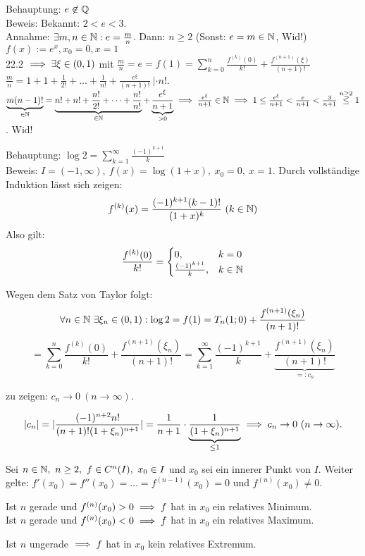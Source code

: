 \documentclass[a4paper,twoside,DIV15,BCOR12mm]{scrbook}
\begin{document}
\begin{beispiele}
\item Behauptung: $e \not\in \mathbb{Q}$ \\
Beweis: Bekannt: $2<e<3$. \\
Annahme: $\exists m,n\in\mathbb{N}: e=\frac{m}{n}$. Dann: $n\ge 2$ (Sonst: $e=m\in\mathbb{N}$, Wid!)\
$f(x):= e^x, x_0 = 0, x=1$ \\
22.2 $\implies \exists \xi \in (0,1)$ mit $\frac{m}{n}=e=f(1)=\sum_{k=0}^n\frac{f^{(k)}(0)}{k!} + \frac{f^{(n+1)}(\xi)}{(n+1)!}$\\
$\frac{m}{n} = 1 + 1+ \frac{1}{2!} + \ldots + \frac{1}{n!} + \frac{e^\xi}{(n+1)!}\  | \cdot n!$. \\
$\underbrace{m(n-1)!}_{\in\mathbb{N}} = \underbrace{n! + n! + \frac{n!}{2!} + \cdots + \frac{n!}{n!}}_{\in \mathbb{N}} + \underbrace{\frac{e^\xi}{n+1}}_{>0} \implies \frac{e^\xi}{n+1} \in \mathbb{N} \implies 1 \le \frac{e^\xi}{n+1} < \frac{e}{n+1} < \frac{3}{n+1} \stackrel{n\ge2}{\le} 1$. Wid!
\item Behauptung: $\log 2 = \sum_{k=1}^{\infty}{\frac{(-1)^{k+1}}{k}}$\\
Beweis: $I = (-1,\infty),\ f(x) = \log(1+x),\ x_0=0,\ x=1.$ Durch vollständige Induktion lässt sich zeigen:
$$f^{(k)}(x) = \frac{(-1)^{k+1}(k-1)!}{(1+x)^k}\ (k\in\MdN)$$
Also gilt:
$$\frac{f^{(k)}(0)}{k!} = \begin{cases}
0,&k=0\\
\frac{(-1)^{k+1}}{k},&k\in\mathbb{N}
\end{cases}$$

Wegen dem Satz von Taylor folgt:
$$\forall n\in\mathbb{N}\ \exists \xi_n\in(0,1): \log 2 = f(1) = T_n(1;0) + \frac{f^{(n+1)}(\xi_n)}{(n+1)!}$$
$$= \sum_{k=0}^{n}{\frac{f^{(k)}(0)}{k!}} + \frac{f^{(n+1)}(\xi_n)}{(n+1)!} = \sum_{k=1}^{\infty}{\frac{(-1)^{k+1}}{k}} + \underbrace{\frac{f^{(n+1)}(\xi_n)}{(n+1)!}}_{=:c_n}$$

zu zeigen: $c_n \to 0\ (n \to \infty).$

$$|c_n| = |\frac{(-1)^{n+2}n!}{(n+1)!(1+\xi_n)^{n+1}}| = \frac{1}{n+1} \cdot \underbrace{\frac{1}{(1+\xi_n)^{n+1}}}_{\le 1} \implies c_n \to 0\ (n \to \infty).$$
\end{beispiele}

\begin{satz}
Sei $n \in \MdN,\ n \ge 2,\ f \in C^n(I),\ x_0 \in I$ und $x_0$ sei ein innerer Punkt von $I$. Weiter gelte: $f'(x_0) = f''(x_0) = \ldots = f^{(n-1)}(x_0) = 0$ und $f^{(n)}(x_0) \ne 0.$
\begin{liste}
\item Ist $n$ gerade und $f^{(n)}(x_0) > 0 \implies f$ hat in $x_0$ ein relatives Minimum.\\
Ist $n$ gerade und $f^{(n)}(x_0) < 0 \implies f$ hat in $x_0$ ein relatives Maximum.
\item Ist $n$ ungerade $\implies f$ hat in $x_0$ kein relatives Extremum.
\end{liste}
\end{satz}
\end{document}
